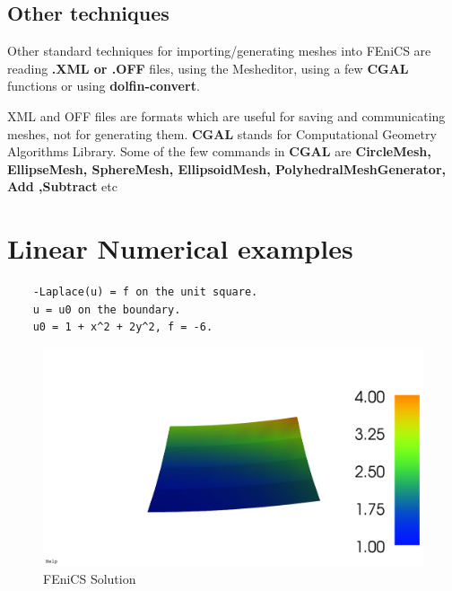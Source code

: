 \subsection{Other techniques}

Other standard techniques for importing/generating meshes into FEniCS are reading \textbf{.XML or .OFF} files, using the Mesheditor, using a few \textbf{CGAL} functions or using \textbf{dolfin-convert}.

\noindent XML and OFF files are formats which are useful for saving and communicating meshes, not for generating them. \textbf{CGAL} stands for Computational Geometry Algorithms Library. Some of the few commands in \textbf{CGAL} are \textbf{CircleMesh, EllipseMesh, SphereMesh, EllipsoidMesh, PolyhedralMeshGenerator, Add ,Subtract }etc

\pagebreak

\section{Linear Numerical examples}

\begin{lstlisting}
	-Laplace(u) = f on the unit square.
	u = u0 on the boundary.
	u0 = 1 + x^2 + 2y^2, f = -6.
\end{lstlisting}
\begin{figure}[h]
	\center
	\includegraphics[scale = 0.25]{images/dirichlet.png}
	\caption{FEniCS Solution}
\end{figure}

